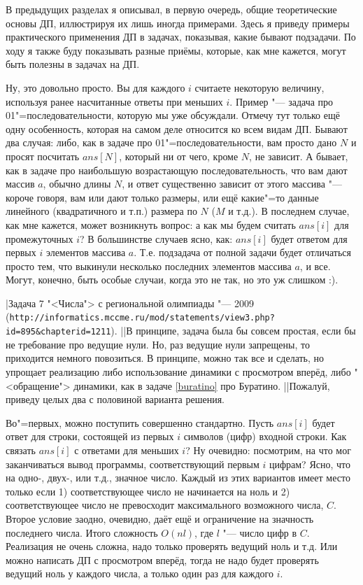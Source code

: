 
В предыдущих разделах я описывал, в первую очередь, общие теоретические основы ДП, иллюстрируя их 
лишь иногда примерами. Здесь я приведу примеры практического применения ДП в задачах, показывая, 
какие бывают подзадачи. По ходу я также буду показывать разные приёмы, которые, как мне кажется, 
могут быть полезны в задачах на ДП.

 Ну, это довольно просто. Вы для каждого $i$ считаете некоторую величину, 
используя ранее насчитанные ответы при меньших $i$. Пример "--- задача про 01"=последовательности, 
которую мы уже обсуждали. Отмечу тут только ещё одну особенность, которая на самом деле относится 
ко всем видам ДП. Бывают два случая: либо, как в задаче про 01"=последовательности, вам просто дано
$N$ и просят посчитать $ans[N]$, который ни от чего, кроме $N$, не зависит. А бывает, как в задаче про 
наибольшую возрастающую последовательность, что вам дают массив $a$, обычно длины $N$, и ответ 
существенно зависит от этого массива "--- короче говоря, вам или дают только размеры, или ещё 
какие"=то данные линейного (квадратичного и т.п.) размера по $N$ ($M$ и т.д.). В последнем случае, 
как мне кажется, может возникнуть вопрос: а как мы будем считать $ans[i]$ для промежуточных $i$? 
В большинстве случаев ясно, как: $ans[i]$ будет ответом для первых $i$ элементов массива $a$. Т.е. 
подзадача от полной задачи будет отличаться просто тем, что выкинули несколько последних элементов 
массива $a$, и все. {\small Могут, конечно, быть особые случаи, когда это не так, но это уж слишком 
:).}

\task|Задача 7 "<Числа"> с региональной олимпиады "--- 2009 \\
(\/\verb`http://informatics.mccme.ru/mod/statements/view3.php?id=895&chapterid=1211`).
||В принципе, задача была бы совсем простая, если бы не требование про ведущие нули. Но, раз 
ведущие нули запрещены, то приходится немного повозиться. В принципе, можно так все и сделать, но 
упрощает реализацию либо использование динамики с просмотром вперёд, либо "<обращение"> динамики, 
как в задаче \ref{buratino} про Буратино.
||Пожалуй, приведу целых два с половиной варианта решения.

Во"=первых, можно поступить совершенно стандартно. Пусть $ans[i]$ будет ответ для строки, состоящей 
из первых $i$ символов (цифр) входной строки. Как связать $ans[i]$ с ответами для меньших $i$? Ну 
очевидно: посмотрим, на что мог заканчиваться вывод программы, соответствующий первым $i$ цифрам? 
Ясно, что на одно-, двух-, или т.д., значное число. Каждый из этих вариантов имеет место только 
если 1) соответствующее число не начинается на ноль и 2) соответствующее число не превосходит 
максимального возможного числа, $C$. Второе условие заодно, очевидно, даёт ещё и ограничение на 
значность последнего числа. Итого сложность $O(nl)$, где $l$ "--- число цифр в $C$. Реализация не 
очень сложна, надо только проверять ведущий ноль и т.д. Или можно написать ДП с просмотром вперёд, 
тогда не надо будет проверять ведущий ноль у каждого числа, а только один раз для каждого $i$.

